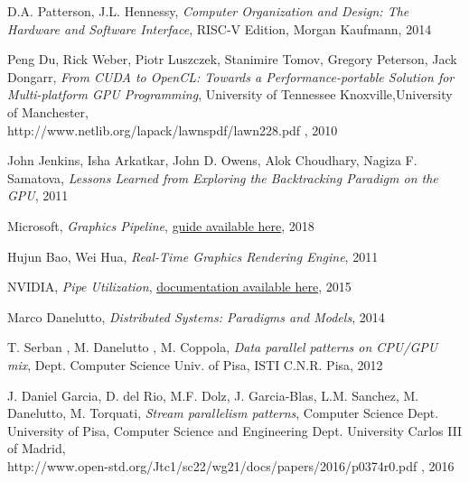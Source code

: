 \documentclass[12pt]{report}
\begin{document}
	\begin{thebibliography}{9}
		D.A. Patterson, J.L. Hennessy, 
		\textit{Computer Organization and Design: The Hardware and Software Interface}, RISC-V Edition, Morgan Kaufmann, 2014
	
	
		Peng Du, Rick Weber, Piotr Luszczek, Stanimire Tomov, Gregory Peterson, Jack Dongarr, 
		\textit{From CUDA to OpenCL: Towards a Performance-portable Solution for Multi-platform GPU Programming}, University of Tennessee Knoxville,University of Manchester,\\ http://www.netlib.org/lapack/lawnspdf/lawn228.pdf , 2010
		
		
		John Jenkins, Isha Arkatkar, John D. Owens, Alok Choudhary, Nagiza F. Samatova, 
		\textit{Lessons Learned from Exploring the Backtracking Paradigm on the GPU}, 2011
		
		Microsoft, \textit{Graphics Pipeline}, \href{https://docs.microsoft.com/en-us/windows/win32/direct3d11/overviews-direct3d-11-graphics-pipeline?redirectedfrom=MSDN}{guide available here}, 2018
		
		Hujun Bao, Wei Hua, \textit{Real-Time Graphics Rendering Engine}, 2011
		
		NVIDIA, \textit{Pipe Utilization}, \href{https://docs.nvidia.com/gameworks/content/developertools/desktop/analysis/report/cudaexperiments/kernellevel/pipeutilization.htm}{documentation available here}, 2015
		
		
		Marco Danelutto,
		\textit{Distributed Systems: Paradigms and Models}, 2014
		
		
		
		T. Serban , M. Danelutto , M. Coppola, \textit{Data parallel patterns on
			CPU/GPU mix}, Dept. Computer Science Univ. of Pisa, ISTI C.N.R. Pisa, 2012
	
		J. Daniel Garcia, D. del Rio, M.F. Dolz, J. Garcia-Blas, L.M. Sanchez, M. Danelutto, M. Torquati, \textit{Stream parallelism patterns}, Computer Science Dept. University of Pisa, Computer Science and Engineering Dept. University Carlos III of Madrid,\\
		http://www.open-std.org/Jtc1/sc22/wg21/docs/papers/2016/p0374r0.pdf , 2016
		

\end{thebibliography}
\end{document}
